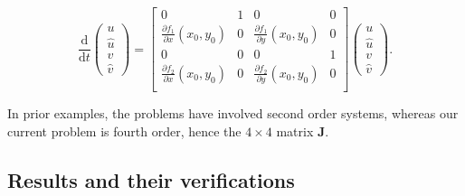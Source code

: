 \documentclass{article}
\begin{document}
\begin{equation}
    \frac{\mathrm{d}}{\mathrm{d}t} \begin{pmatrix}
        u \\
        \hat{u} \\
        v \\
        \hat{v}
    \end{pmatrix} = \begin{bmatrix}
        0 & 1 & 0 & 0 \\
        \frac{\partial f_1}{\partial x}(x_0,y_0) & 0 & \frac{\partial f_1}{\partial y}(x_0,y_0) & 0 \\
        0 & 0 & 0 & 1 \\
        \frac{\partial f_2}{\partial x}(x_0,y_0) & 0 & \frac{\partial f_2}{\partial y}(x_0,y_0) & 0 \\
    \end{bmatrix} \begin{pmatrix}
        u \\
        \hat{u} \\
        v \\
        \hat{v}
    \end{pmatrix}.
    \label{eqn:twomass_matrix_jacobian_quad}
\end{equation}

In prior examples, the problems have involved second order systems,
whereas our current problem is fourth order,
hence the \(4\times4\) matrix \(\mathbf{J}\).









\subsection{Results and their verifications}
\end{document}
